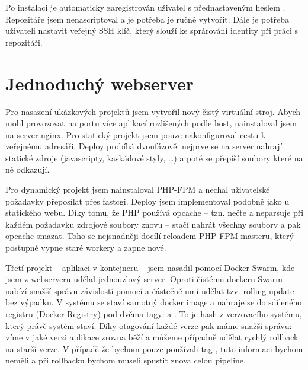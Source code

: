     Po instalaci je automaticky zaregistrován uživatel  s přednastaveným heslem . Repozitáře jsem nenascriptoval a je potřeba je ručně vytvořit. Dále je potřeba uživateli nastavit veřejný SSH klíč, který slouží ke sprárování identity při práci s repozitáři.

\section{Jednoduchý webserver}
    Pro nasazení ukázkových projektů jsem vytvořil nový čistý virtuální stroj. Abych mohl provozovat na \HTTP portu více aplikací rozlišených podle host, nainstaloval jsem na server nginx. Pro statický projekt jsem pouze nakonfiguroval cestu k veřejnému adresáři. Deploy probíhá dvoufázově: nejprve se na server nahrají statické zdroje (javascripty, kaskádové styly, \ldots) a poté se přepíší  soubory které na ně odkazují.

    Pro dynamický projekt jsem nainstaloval PHP-FPM a nechal uživatelské požadavky přeposílat přes fastcgi. Deploy jsem implementoval podobně jako u statického webu. Díky tomu, že PHP používá opcache -- tzn. nečte a neparsuje při každém požadavku zdrojové soubory znovu -- stačí nahrát všechny soubory a pak opcache smazat. Toho se nejsnadněji docílí reloadem PHP-FPM masteru, který postupně vypne staré workery a zapne nové.

    Třetí projekt -- aplikaci v kontejneru -- jsem nasadil pomocí Docker Swarm, kde jsem z webserveru udělal jednouzlový server. Oproti čistému dockeru Swarm nabízí snažší správu závislostí pomocí  a částečně umí udělat tzv. rolling update bez výpadku. V \CI systému se staví samotný docker image a nahraje se do sdíleného registru (Docker Registry) pod dvěma tagy:  a . To je hash z verzovacího systému, který právě \CI systém staví. Díky otagování každé verze pak máme snažší správu: víme v jaké verzi aplikace zrovna běží a můžeme případně udělat rychlý rollback na starší verze. V případě že bychom pouze používali tag , tuto informaci bychom neměli a při rollbacku bychom museli spustit znova celou \CI pipeline.
